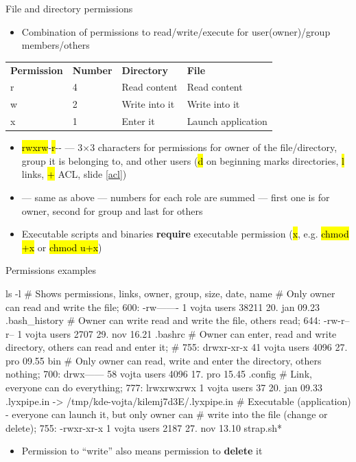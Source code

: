 \documentclass[compress, ucs, xelatex, 11pt, xcolor=svgnames, aspectratio=169,
	hyperref={
		bookmarks=true,
		unicode=true,
		colorlinks=true,
		pdftitle={Linux, command line and MetaCentrum},
		plainpages=false,
		pdfauthor={Vojtech Zeisek},
		pdfsubject={Course about use of Linux command line, writing shell scripts and using MetaCentrum of CESNET},
		pdfcreator={XeLaTeX},
		pdfkeywords={Linux, GNU, BASH, shell, command line, MetaCentrum},
		linkcolor=DarkRed, %
		anchorcolor=DarkBlue, %
		citecolor=Indigo, %
		filecolor=NavyBlue, %
		menucolor=DarkMagenta, %
		urlcolor=DarkBlue, %
		pdftex},
	url={hyphens, lowtilde} %
	]{beamer}
\renewcommand{\texttt}[1]{\hl{\ttfamily #1}}
\begin{document}
\begin{frame}{File and directory permissions}
	\label{permissions}
	\begin{itemize}
		\item Combination of permissions to read/write/execute for user(owner)/group members/others
	\end{itemize}
	\begin{center}
		\begin{tabular}{llll}
			\textbf{Permission} & \textbf{Number} & \textbf{Directory} & \textbf{File}\\
			r & 4 & Read content & Read content\\
			w & 2 & Write into it & Write into it\\
			x & 1 & Enter it & Launch application
		\end{tabular}
	\end{center}
	\begin{itemize}
		\item \texttt{rwxrw}-\texttt{r}-{-} --- 3$\times$3 characters for permissions for owner of the file/directory, group it is belonging to, and other users (\texttt{d} on beginning marks directories, \texttt{l} links, \texttt{+} ACL, slide \ref{acl})
		\item \texttt{764} --- same as above --- numbers for each role are summed --- first one is for owner, second for group and last for others
		\item Executable scripts and binaries \textbf{require} executable permission (\texttt{x}, e.g. \texttt{chmod +x} or \texttt{chmod u+x})
	\end{itemize}
\end{frame}

\begin{frame}[fragile]{Permissions examples}
	\begin{bashcode}
    ls -l # Shows permissions, links, owner, group, size, date, name
    # Only owner can read and write the file; 600:
    -rw-------   1 vojta users   38211 20. jan 09.23 .bash_history
    # Owner can write read and write the file, others read; 644:
    -rw-r--r--   1 vojta users    2707 29. nov 16.21 .bashrc
    # Owner can enter, read and write directory, others can read and enter it;
    # 755:
    drwxr-xr-x  41 vojta users    4096 27. pro 09.55 bin
    # Only owner can read, write and enter the directory, others nothing; 700:
    drwx------  58 vojta users    4096 17. pro 15.45 .config
    # Link, everyone can do everything; 777:
    lrwxrwxrwx   1 vojta users      37 20. jan 09.33 .lyxpipe.in ->
      /tmp/kde-vojta/kilemj7d3E/.lyxpipe.in
    # Executable (application) - everyone can launch it, but only owner can
    # write into the file (change or delete); 755:
    -rwxr-xr-x   1 vojta users    2187 27. nov 13.10 strap.sh*
	\end{bashcode}
	\vfill
	\begin{itemize}
		\item Permission to \enquote{write} also means permission to \textbf{delete} it
	\end{itemize}
\end{frame}
\end{document}

